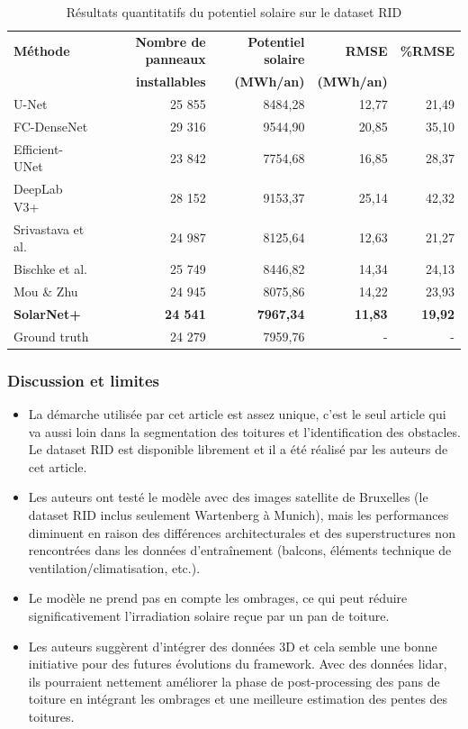 \begin{table}[H]
    \centering
    \small
    \begin{tabular}{lrrrr}
        \toprule
        \textbf{Méthode} & \textbf{Nombre de panneaux} & \textbf{Potentiel solaire} & \textbf{RMSE} & \textbf{\%RMSE} \\
        & \textbf{installables} & \textbf{(MWh/an)} & \textbf{(MWh/an)} & \\
        \midrule
        U-Net & 25 855 & 8484,28 & 12,77 & 21,49 \\
        FC-DenseNet & 29 316 & 9544,90 & 20,85 & 35,10 \\
        Efficient-UNet & 23 842 & 7754,68 & 16,85 & 28,37 \\
        DeepLab V3+  & 28 152 & 9153,37 & 25,14 & 42,32 \\
        Srivastava et al. & 24 987 & 8125,64 & 12,63 & 21,27 \\
        Bischke et al. & 25 749 & 8446,82 & 14,34 & 24,13 \\
        Mou \& Zhu & 24 945 & 8075,86 & 14,22 & 23,93 \\
        \textbf{SolarNet+} & \textbf{24 541} & \textbf{7967,34} & \textbf{11,83} & \textbf{19,92} \\
        \midrule
        Ground truth & 24 279 & 7959,76 & - & - \\
        \bottomrule
    \end{tabular}
    \caption{Résultats quantitatifs du potentiel solaire sur le dataset RID \cite{li_deep_2024}}
    \label{tab:solar_net_plus_comparaison_quant}
\end{table}


\subsubsection{Discussion et limites}
\begin{itemize}
    \item La démarche utilisée par cet article est assez unique, c'est le seul article qui va aussi loin dans la segmentation des toitures et l'identification des obstacles. Le dataset RID est disponible librement et il a été réalisé par les auteurs de cet article.
    \item Les auteurs ont testé le modèle avec des images satellite de Bruxelles (le dataset RID inclus seulement Wartenberg à Munich), mais les performances diminuent en raison des différences architecturales et des superstructures non rencontrées dans les données d'entraînement (balcons, éléments technique de ventilation/climatisation, etc.).
    \item Le modèle ne prend pas en compte les ombrages, ce qui peut réduire significativement l'irradiation solaire reçue par un pan de toiture.
    \item Les auteurs suggèrent d'intégrer des données 3D et cela semble une bonne initiative pour des futures évolutions du framework. Avec des données \gls{lidar}, ils pourraient nettement améliorer la phase de post-processing des pans de toiture en intégrant les ombrages et une meilleure estimation des pentes des toitures.
\end{itemize}

